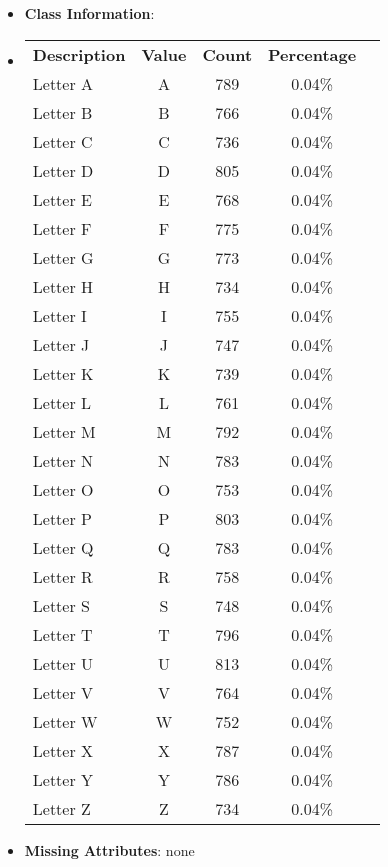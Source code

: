 \documentclass[11pt]{article}
\newcommand{\bb}{\textbf}
\begin{document}
\begin{itemize}[leftmargin=*]
  \item[] \bb{Class Information}:
  \item[]
  \begin{tabular}{l c c c c }
    \bb{Description} & \bb{Value} & \bb{Count} & \bb{Percentage} \\
    Letter A                & A          & 789        & 0.04\% \\
    Letter B                & B          & 766        & 0.04\% \\
    Letter C                & C          & 736        & 0.04\% \\
    Letter D                & D          & 805        & 0.04\% \\
    Letter E                & E          & 768        & 0.04\% \\
    Letter F                & F          & 775        & 0.04\% \\
    Letter G                & G          & 773        & 0.04\% \\
    Letter H                & H          & 734        & 0.04\% \\
    Letter I                & I          & 755        & 0.04\% \\
    Letter J                & J          & 747        & 0.04\% \\
    Letter K                & K          & 739        & 0.04\% \\
    Letter L                & L          & 761        & 0.04\% \\
    Letter M                & M          & 792        & 0.04\% \\
    Letter N                & N          & 783        & 0.04\% \\
    Letter O                & O          & 753        & 0.04\% \\
    Letter P                & P          & 803        & 0.04\% \\
    Letter Q                & Q          & 783        & 0.04\% \\
    Letter R                & R          & 758        & 0.04\% \\
    Letter S                & S          & 748        & 0.04\% \\
    Letter T                & T          & 796        & 0.04\% \\
    Letter U                & U          & 813        & 0.04\% \\
    Letter V                & V          & 764        & 0.04\% \\
    Letter W                & W          & 752        & 0.04\% \\
    Letter X                & X          & 787        & 0.04\% \\
    Letter Y                & Y          & 786        & 0.04\% \\
    Letter Z                & Z          & 734        & 0.04\%
  \end{tabular}
  \item[] \bb{Missing Attributes}: none
\end{itemize}
\end{document}
